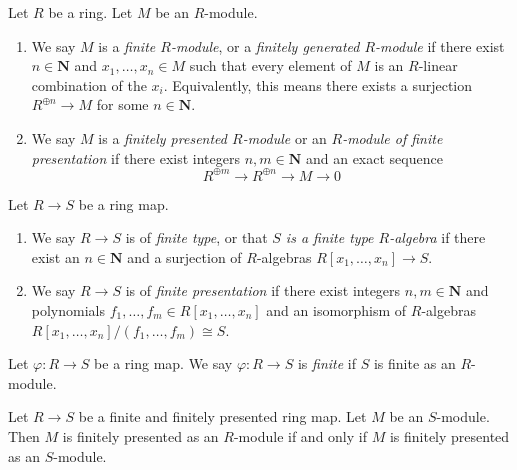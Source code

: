 \begin{definition}
\label{definition-module-finite-type}
Let $R$ be a ring. Let $M$ be an $R$-module.
\begin{enumerate}
\item We say $M$ is a {\it finite $R$-module}, or a {\it finitely generated
$R$-module} if there exist $n \in \mathbf{N}$ and $x_1, \ldots, x_n \in M$
such that every element of $M$ is an $R$-linear combination of the $x_i$.
Equivalently, this means there exists a surjection
$R^{\oplus n} \to M$ for some $n \in \mathbf{N}$.
\item We say $M$ is a {\it finitely presented $R$-module} or an
{\it $R$-module of finite presentation} if there exist integers
$n, m \in \mathbf{N}$ and an exact sequence
$$
R^{\oplus m} \longrightarrow R^{\oplus n} \longrightarrow M \longrightarrow 0
$$
\end{enumerate}
\end{definition}

\begin{definition}
\label{definition-finite-type}
Let $R \to S$ be a ring map.
\begin{enumerate}
\item We say $R \to S$ is of {\it finite type}, or that {\it $S$ is a finite
type $R$-algebra} if there exist an $n \in \mathbf{N}$ and a surjection
of $R$-algebras $R[x_1, \ldots, x_n] \to S$.
\item We say $R \to S$ is of {\it finite presentation} if there
exist integers $n, m \in \mathbf{N}$ and polynomials
$f_1, \ldots, f_m \in R[x_1, \ldots, x_n]$
and an isomorphism of $R$-algebras
$R[x_1, \ldots, x_n]/(f_1, \ldots, f_m) \cong S$.
\end{enumerate}
\end{definition}

\begin{definition}
\label{definition-finite-ring-map}
Let $\varphi : R \to S$ be a ring map. We say $\varphi : R \to S$ is
{\it finite} if $S$ is finite as an $R$-module.
\end{definition}

\begin{lemma}
\label{lemma-finite-finitely-presented-extension}
Let $R \to S$ be a finite and finitely presented ring map.
Let $M$ be an $S$-module.
Then $M$ is finitely presented as an $R$-module if and only if
$M$ is finitely presented as an $S$-module.
\end{lemma}

